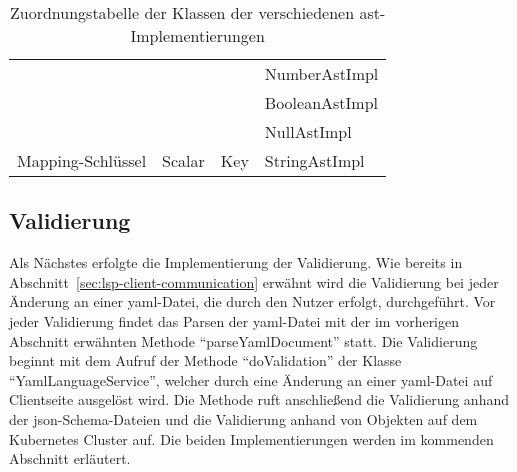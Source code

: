 \begin{table}[htp]
\begin{tabular}{llll}
                                  &                                                                                                                  &                               & NumberAstImpl                                                                                                    \\
                                  &                                                                                                                  &                               & BooleanAstImpl                                                                                                   \\
                                  &                                                                                                                  &                               & NullAstImpl                                                                                                      \\
    \midrule
    Mapping-Schlüssel             & Scalar                                                                                                           & Key                           & StringAstImpl                                                                                                    \\
    \bottomrule
  \end{tabular}
  \caption{Zuordnungstabelle der Klassen der verschiedenen \acs{ast}-Implementierungen}
  \label{tbl:yaml-ast-to-json-ast-convert}
\end{table}

\subsection{Validierung}\label{subsec:validation}

Als Nächstes erfolgte die Implementierung der Validierung. Wie bereits in Abschnitt~\ref{sec:lsp-client-communication} erwähnt wird die
Validierung bei jeder Änderung an einer \ac{yaml}-Datei, die durch den Nutzer erfolgt, durchgeführt.
Vor jeder Validierung findet das Parsen der \ac{yaml}-Datei mit der im vorherigen Abschnitt erwähnten Methode ``parseYamlDocument'' statt.
Die Validierung beginnt mit dem Aufruf der Methode ``doValidation'' der Klasse ``YamlLanguageService'', welcher
durch eine Änderung an einer \ac{yaml}-Datei auf Clientseite ausgelöst wird.
Die Methode ruft anschließend die Validierung anhand der \ac{json}-Schema-Dateien und die Validierung anhand von Objekten auf dem Kubernetes Cluster
auf. Die beiden Implementierungen werden im kommenden Abschnitt erläutert.

